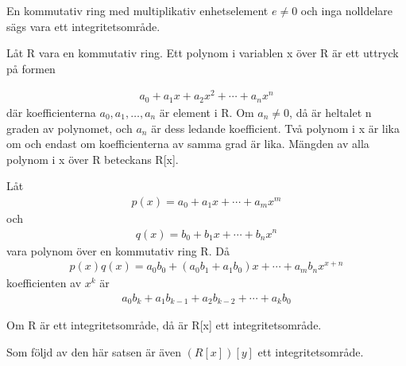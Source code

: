 \begin{definition}
 En kommutativ ring med multiplikativ enhetselement $e \neq 0$ och inga nolldelare sägs vara ett integritetsområde.
\end{definition}

\begin{definition}
Låt R vara en kommutativ ring. Ett polynom i variablen x över R är ett uttryck på formen

\begin{align*}
 a_0+a_1x+a_2x^2+\cdots+a_nx^n
\end{align*}
där koefficienterna $a_0, a_1,\dots,a_n$ är element i R. Om $a_n \neq 0$, då är heltalet n graden av polynomet, och $a_n$ är dess ledande koefficient. Två polynom i x är lika om och endast om
koefficienterna av samma grad är lika. Mängden av alla polynom i x över R beteckans R[x].

\end{definition}

\begin{definition}
 Låt
\begin{align*}
 p(x)=a_0+a_1x+\cdots+a_mx^m
\end{align*}
och
\begin{align*}
 q(x)=b_0+b_1x+\cdots+b_nx^n
\end{align*}
vara polynom över en kommutativ ring R. Då
\begin{align*}
 p(x)q(x)=a_0b_0+(a_0b_1+a_1b_0)x+\cdots+a_mb_nx^{x+n}
\end{align*}
koefficienten av $x^k$ är
\begin{align*}
 a_0b_k+a_1b_{k-1}+a_2b_{k-2}+\cdots+a_kb_0
\end{align*}

\end{definition}

\begin{theorem}
 Om R är ett integritetsområde, då är R[x] ett integritetsområde.
\end{theorem}

Som följd av den här satsen är även $(R[x])[y]$ ett integritetsområde.
